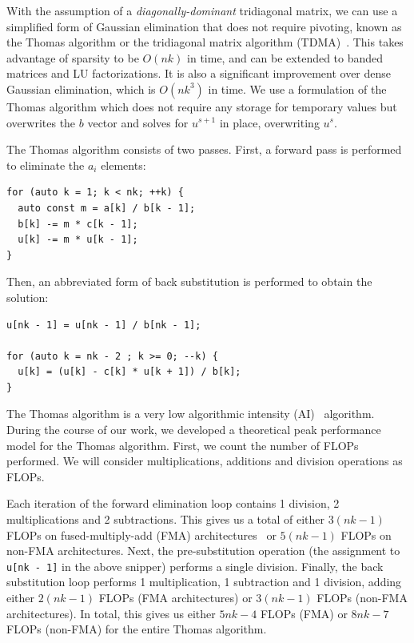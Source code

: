 \documentclass{sig-alternate-05-2015}
\begin{document}
With the assumption of a \emph{diagonally-dominant} tridiagonal matrix, 
  we can use a simplified
  form of Gaussian elimination that does not require pivoting, known as the
  Thomas algorithm or the tridiagonal matrix algorithm
  (TDMA)~\cite{ConteEtAlElementaryNumericalAnalysis,QuarteroniEtAl2007,TDMA}. 
This takes advantage of sparsity to be \(O(nk)\) in time, 
  and can be extended to banded matrices and LU factorizations.
It is also a significant improvement over dense Gaussian elimination,
  which is \(O(nk^3)\) in time. 
We use a formulation of the Thomas algorithm which does not require any storage
  for temporary values but overwrites the \(b\) vector and solves for \(u^{s+1}\)
  in place, overwriting \(u^{s}\).

\pagebreak

The Thomas algorithm consists of two passes.  First, a forward pass is
  performed to eliminate the \(a_i\) elements:
\begin{lstlisting}
for (auto k = 1; k < nk; ++k) {
  auto const m = a[k] / b[k - 1];
  b[k] -= m * c[k - 1];
  u[k] -= m * u[k - 1];
} 
\end{lstlisting}
Then, an abbreviated form of back substitution is performed to obtain the
  solution:
\begin{lstlisting}
u[nk - 1] = u[nk - 1] / b[nk - 1];

for (auto k = nk - 2 ; k >= 0; --k) {
  u[k] = (u[k] - c[k] * u[k + 1]) / b[k];
} 
\end{lstlisting}

The Thomas algorithm is a very low algorithmic intensity (AI)~\cite{roofline}
  algorithm.
During the course of our work, we developed a theoretical peak performance
  model for the Thomas algorithm.
First, we count the number of FLOPs performed.
We will consider multiplications, additions and division operations as FLOPs.

Each iteration of the forward elimination loop contains 1 division, 2
  multiplications and 2 subtractions.
This gives us a total of either \(3(nk-1)\) FLOPs on fused-multiply-add (FMA)
  architectures~\cite{intel_fma_website} or 
  \(5(nk-1)\) FLOPs on non-FMA architectures.
Next, the pre-substitution operation (the assignment to \lstinline{u[nk - 1]}
  in the above snipper) performs a single division.
Finally, the back substitution loop performs 1 multiplication, 1
  subtraction and 1 division, adding either \(2(nk-1)\) FLOPs (FMA architectures)
  or \(3(nk-1)\) FLOPs (non-FMA architectures).
In total, this gives us either \(5nk-4\) FLOPs (FMA) or \(8nk-7\) FLOPs
  (non-FMA) for the entire Thomas algorithm.
\end{document}
